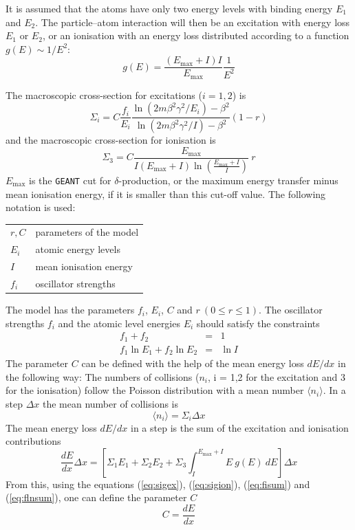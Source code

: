 \documentclass{article}
\newcommand{\Emax}{\ensuremath{E_{\mathrm{max}}}}
\newcommand{\GEANT}{\texttt{GEANT}}
\begin{document}
It is assumed that the atoms have only two energy levels with binding
energy $E_1$ and $E_2$.  The particle--atom interaction will then be
an excitation with energy loss $E_1$ or $E_2$, or an ionisation with
an energy loss distributed according to a function $g(E) \sim 1/E^2$:
\begin{equation}
g(E) = \frac{(\Emax + I)I}{\Emax} \frac{1}{E^2}
\end{equation}

The macroscopic cross-section for excitations ($i=1,2$) is
\begin{equation}
\label{eq:sigex}
\Sigma_i = C \frac{f_i}{E_i} \frac{\ln (2 m \beta^2 \gamma^2/E_i) - \beta^2}
             {\ln (2 m \beta^2 \gamma^2/ I) - \beta^2}(1-r)
\end{equation}
and the macroscopic cross-section for ionisation is
\begin{equation}
\label{eq:sigion}
\Sigma_3 = C \frac{\Emax}{I(\Emax+I) \ln(\frac{\Emax+I}{I})}
           ~ r
\end{equation}
\Emax{} is the \GEANT{} cut for $\delta$-production, or the maximum
energy transfer minus mean ionisation energy, if it is smaller than
this cut-off value.  The following notation is used:

\begin{tabular}{ll}
$r, C$          & parameters of the model \\
$E_i$           & atomic energy levels \\
$I$             & mean ionisation energy \\
${f_i}$         & oscillator strengths 
\end{tabular}

The model has the parameters $f_i$, $E_i$, $C$ and $r ~(0\leq r\leq
1)$.  The oscillator strengths $f_i$ and the atomic level energies
$E_i$ should satisfy the constraints
\begin{eqnarray}
f_1 + f_2 & = & 1  \label{eq:fisum}\\
f_1 \ln E_1 + f_2 \ln E_2 & = & \ln I \label{eq:flnsum}
\end{eqnarray}
The parameter $C$ can be defined with the help of the mean energy loss
$dE/dx$ in the following way: The numbers of collisions ($n_i$, i =
1,2 for the excitation and 3 for the ionisation) follow the Poisson
distribution with a mean number $ \langle n_i \rangle $. In a step
$\Delta x$ the mean number of collisions is
\begin{equation}
\langle n_i \rangle = \Sigma_i \Delta x
\end{equation}
The mean energy loss $dE/dx$ in a step is the sum of the excitation
and ionisation contributions
\begin{equation}
\frac{dE}{dx} \Delta x = \left[ \Sigma_1 E_1 + \Sigma_2 E_2 +
                          \Sigma_3 \int_{I}^{\Emax+I} E~g(E)~dE \right]
                         \Delta x
\end{equation}
From this, using the equations (\ref{eq:sigex}), (\ref{eq:sigion}),
(\ref{eq:fisum}) and (\ref{eq:flnsum}), one can define the parameter
$C$
\begin{equation}
C = \frac{dE}{dx}
\end{equation}
\end{document}
